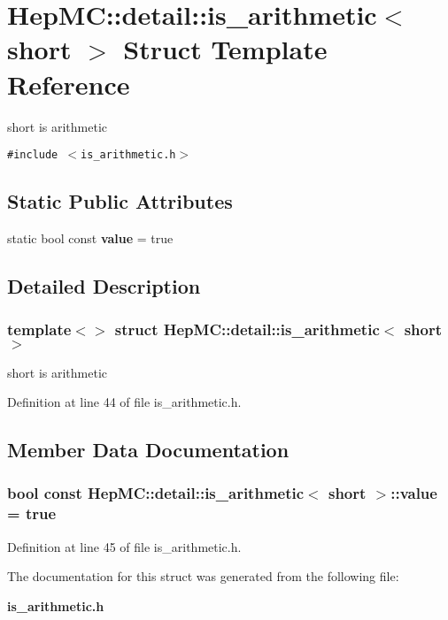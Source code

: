 \section{Hep\-MC::detail::is\_\-arithmetic$<$ short $>$ Struct Template Reference}
\label{structHepMC_1_1detail_1_1is__arithmetic_3_01short_01_4}
short is arithmetic  


{\tt \#include $<$is\_\-arithmetic.h$>$}

\subsection*{Static Public Attributes}
\begin{CompactItemize}
\item 
static bool const {\bf value} = true
\end{CompactItemize}


\subsection{Detailed Description}
\subsubsection*{template$<$$>$ struct Hep\-MC::detail::is\_\-arithmetic$<$ short $>$}

short is arithmetic 



Definition at line 44 of file is\_\-arithmetic.h.

\subsection{Member Data Documentation}
\subsubsection{\setlength{\rightskip}{0pt plus 5cm}bool const {\bf Hep\-MC::detail::is\_\-arithmetic}$<$ short $>$::{\bf value} = true\hspace{0.3cm}{\tt  [static]}}\label{structHepMC_1_1detail_1_1is__arithmetic_3_01short_01_4_23a7af930b496eaae0024ca759cc7e09}




Definition at line 45 of file is\_\-arithmetic.h.

The documentation for this struct was generated from the following file:\begin{CompactItemize}
\item 
{\bf is\_\-arithmetic.h}\end{CompactItemize}
